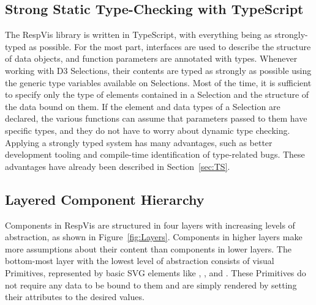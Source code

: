 \subsection{Strong Static Type-Checking with TypeScript}

The RespVis library is written in TypeScript, with everything being as
strongly-typed as possible. For the most part, interfaces are used to
describe the structure of data objects, and function parameters are
annotated with types. Whenever working with D3 Selections, their
contents are typed as strongly as possible using the generic type
variables available on Selections. Most of the time, it is sufficient
to specify only the type of elements contained in a Selection and the
structure of the data bound on them. If the element and data types of
a Selection are declared, the various functions can assume that
parameters passed to them have specific types, and they do not have to
worry about dynamic type checking. Applying a strongly typed system
has many advantages, such as better development tooling and
compile-time identification of type-related bugs. These advantages
have already been described in Section~\ref{sec:TS}.







\subsection{Layered Component Hierarchy}

Components in RespVis are structured in four layers with increasing
levels of abstraction, as shown in Figure~\ref{fig:Layers}. Components
in higher layers make more assumptions about their content than
components in lower layers. The bottom-most layer with the lowest
level of abstraction consists of visual Primitives, represented by
basic SVG elements like , , and
. These Primitives do not require any data to be bound to
them and are simply rendered by setting their attributes to the
desired values.



